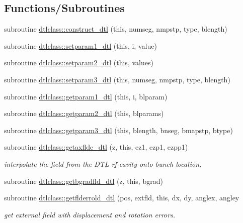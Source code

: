 \subsection*{Functions/\+Subroutines}
\begin{DoxyCompactItemize}
\item 
subroutine \mbox{\hyperlink{namespacedtlclass_a5f65e89a18b2765e966ea8c1db85aa0c}{dtlclass\+::construct\+\_\+dtl}} (this, numseg, nmpstp, type, blength)
\item 
subroutine \mbox{\hyperlink{namespacedtlclass_aa8af784d85ac535b6238e9dd4d844be9}{dtlclass\+::setparam1\+\_\+dtl}} (this, i, value)
\item 
subroutine \mbox{\hyperlink{namespacedtlclass_a267abecac3bfad96fd1ce717ba50c8b4}{dtlclass\+::setparam2\+\_\+dtl}} (this, values)
\item 
subroutine \mbox{\hyperlink{namespacedtlclass_aaccb0362c1862fd4f4e34a23f1bb25b9}{dtlclass\+::setparam3\+\_\+dtl}} (this, numseg, nmpstp, type, blength)
\item 
subroutine \mbox{\hyperlink{namespacedtlclass_abd0fd1a590b8e198a5b7081e105f11e8}{dtlclass\+::getparam1\+\_\+dtl}} (this, i, blparam)
\item 
subroutine \mbox{\hyperlink{namespacedtlclass_aac10b9bb174a986cd15c1f0a11369c57}{dtlclass\+::getparam2\+\_\+dtl}} (this, blparams)
\item 
subroutine \mbox{\hyperlink{namespacedtlclass_adb7337b9d81c5d4fef24ba72ad107cbe}{dtlclass\+::getparam3\+\_\+dtl}} (this, blength, bnseg, bmapstp, btype)
\item 
subroutine \mbox{\hyperlink{namespacedtlclass_a1fb756446dfd217cc32e4a9088e7f4c7}{dtlclass\+::getaxflde\+\_\+dtl}} (z, this, ez1, ezp1, ezpp1)
\begin{DoxyCompactList}\small\item\em interpolate the field from the D\+TL rf cavity onto bunch location. \end{DoxyCompactList}\item 
subroutine \mbox{\hyperlink{namespacedtlclass_a79f0618eb609338c97470f6f8f05a848}{dtlclass\+::getbgradfld\+\_\+dtl}} (z, this, bgrad)
\item 
subroutine \mbox{\hyperlink{namespacedtlclass_aa42e9d402234d9be025275b620c42326}{dtlclass\+::getflderrold\+\_\+dtl}} (pos, extfld, this, dx, dy, anglex, angley
\begin{DoxyCompactList}\small\item\em get external field with displacement and rotation errors. \end{DoxyCompactList}\item 

\end{DoxyCompactItemize}
